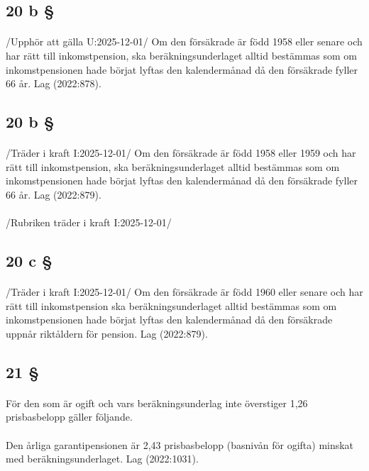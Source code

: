 \documentclass[a4paper,notitlepage,openany,10pt]{book}
\begin{document}
\subsection*{20 b §}
\paragraph*{}
/Upphör att gälla U:2025-12-01/
Om den försäkrade är född 1958 eller senare och har rätt till inkomstpension, ska beräkningsunderlaget alltid bestämmas som om inkomstpensionen hade börjat lyftas den kalendermånad då den försäkrade fyller 66 år.
Lag (2022:878).
\subsection*{20 b §}
\paragraph*{}
/Träder i kraft I:2025-12-01/
Om den försäkrade är född 1958 eller 1959 och har rätt till inkomstpension, ska beräkningsunderlaget alltid bestämmas som om inkomstpensionen hade börjat lyftas den kalendermånad då den försäkrade fyller 66 år.
Lag (2022:879).
\paragraph*{}
/Rubriken träder i kraft I:2025-12-01/
\subsection*{20 c §}
\paragraph*{}
/Träder i kraft I:2025-12-01/
Om den försäkrade är född 1960 eller senare och har rätt till inkomstpension ska beräkningsunderlaget alltid bestämmas som om inkomstpensionen hade börjat lyftas den kalendermånad då den försäkrade uppnår riktåldern för pension.
Lag (2022:879).
\subsection*{21 §}
\paragraph*{}
För den som är ogift och vars beräkningsunderlag inte överstiger 1,26 prisbasbelopp gäller följande.
\paragraph*{}
Den årliga garantipensionen är 2,43 prisbasbelopp (basnivån för ogifta) minskat med beräkningsunderlaget.
Lag (2022:1031).
\end{document}
